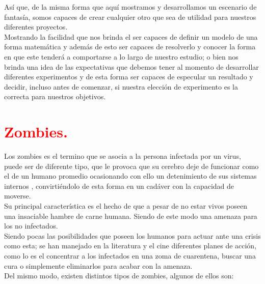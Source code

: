 \documentclass[12pt]{article}
\begin{document}
 Así que, de la misma forma que aquí mostramos y desarrollamos un escenario de fantasía, somos capaces de crear cualquier otro que sea de utilidad para nuestros diferentes proyectos.\\
 
 Mostrando la facilidad que nos brinda el ser capaces de definir un modelo de una forma matemática y además de esto ser capaces de resolverlo y conocer la forma en que este tenderá a comportarse a lo largo de nuestro estudio; o bien nos brinda una idea de las expectativas que debemos tener al momento de desarrollar diferentes experimentos y de esta forma ser capaces de especular un resultado y decidir, incluso antes de comenzar, si nuestra elección de experimento es la correcta para nuestros objetivos.
 
 
 
 
\section*{\textcolor{Red}{Zombies.}}

Los zombies es el termino que se asocia a la persona infectada por un virus, puede ser de diferente tipo, que le provoca que su cerebro deje de funcionar como el de un humano promedio ocasionando con ello un detenimiento de sus sistemas internos , convirtiéndolo de esta forma en un cadáver con la capacidad de moverse.\\ 

Su principal característica es el hecho de que a pesar de no estar vivos poseen una insaciable hambre de carne humana. Siendo de este modo una amenaza para los no infectados.\\

Siendo pocas las posibilidades que poseen los humanos para actuar ante una crisis como esta; se han manejado en la literatura y el cine diferentes planes de acción, como lo es el concentrar a los infectados en una zoma de cuarentena, buscar una cura o simplemente eliminarlos para acabar con la amenaza.\\

Del mismo modo, existen distintos tipos de zombies, algunos de ellos son:
\end{document}
